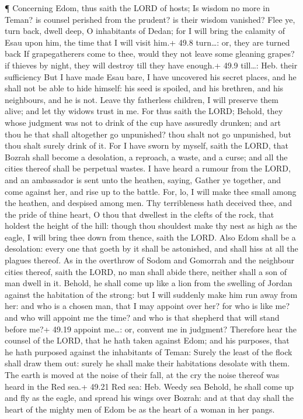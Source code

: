  ¶ Concerning Edom, thus saith the LORD of hosts; Is wisdom
no more in Teman? is counsel perished from the prudent? is their wisdom
vanished?  Flee ye, turn back, dwell deep, O inhabitants of
Dedan; for I will bring the calamity of Esau upon him, the time that I
will visit him.+ 49.8 turn\ldots: or, they are turned back 
If grapegatherers come to thee, would they not leave some gleaning
grapes? if thieves by night, they will destroy till they have enough.+
49.9 till\ldots: Heb. their sufficiency  But I have made
Esau bare, I have uncovered his secret places, and he shall not be able
to hide himself: his seed is spoiled, and his brethren, and his
neighbours, and he is not.  Leave thy fatherless children,
I will preserve them alive; and let thy widows trust in me.
 For thus saith the LORD; Behold, they whose judgment was
not to drink of the cup have assuredly drunken; and art thou he that
shall altogether go unpunished? thou shalt not go unpunished, but thou
shalt surely drink of it.  For I have sworn by myself,
saith the LORD, that Bozrah shall become a desolation, a reproach, a
waste, and a curse; and all the cities thereof shall be perpetual
wastes.  I have heard a rumour from the LORD, and an
ambassador is sent unto the heathen, saying, Gather ye together, and
come against her, and rise up to the battle.  For, lo, I
will make thee small among the heathen, and despised among men.
 Thy terribleness hath deceived thee, and the pride of
thine heart, O thou that dwellest in the clefts of the rock, that
holdest the height of the hill: though thou shouldest make thy nest as
high as the eagle, I will bring thee down from thence, saith the LORD.
 Also Edom shall be a desolation: every one that goeth by
it shall be astonished, and shall hiss at all the plagues thereof.
 As in the overthrow of Sodom and Gomorrah and the
neighbour cities thereof, saith the LORD, no man shall abide there,
neither shall a son of man dwell in it.  Behold, he shall
come up like a lion from the swelling of Jordan against the habitation
of the strong: but I will suddenly make him run away from her: and who
is a chosen man, that I may appoint over her? for who is like me? and
who will appoint me the time? and who is that shepherd that will stand
before me?+ 49.19 appoint me\ldots: or, convent me in judgment?
 Therefore hear the counsel of the LORD, that he hath taken
against Edom; and his purposes, that he hath purposed against the
inhabitants of Teman: Surely the least of the flock shall draw them out:
surely he shall make their habitations desolate with them. 
The earth is moved at the noise of their fall, at the cry the noise
thereof was heard in the Red sea.+ 49.21 Red sea: Heb. Weedy sea
 Behold, he shall come up and fly as the eagle, and spread
his wings over Bozrah: and at that day shall the heart of the mighty men
of Edom be as the heart of a woman in her pangs.

